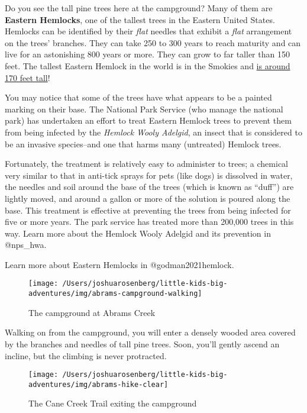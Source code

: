 \documentclass[
]{book}
\begin{document}
\begin{rmdscience}
Do you see the tall pine trees here at the campground? Many of them are
\textbf{Eastern Hemlocks}, one of the tallest trees in the Eastern
United States. Hemlocks can be identified by their \emph{flat} needles
that exhibit a \emph{flat} arrangement on the trees' branches. They can
take 250 to 300 years to reach maturity and can live for an astonishing
800 years or more. They can grow to far taller than 150 feet. The
tallest Eastern Hemlock in the world is in the Smokies and
\href{https://www.monumentaltrees.com/en/trees/tsugacanadensis/records/}{is
around 170 feet tall}!

You may notice that some of the trees have what appears to be a painted
marking on their base. The National Park Service (who manage the
national park) has undertaken an effort to treat Eastern Hemlock trees
to prevent them from being infected by the \emph{Hemlock Wooly Adelgid},
an insect that is considered to be an invasive species--and one that
harms many (untreated) Hemlock trees.

Fortunately, the treatment is relatively easy to administer to trees; a
chemical very similar to that in anti-tick sprays for pets (like dogs)
is dissolved in water, the needles and soil around the base of the trees
(which is known as ``duff'') are lightly moved, and around a gallon or
more of the solution is poured along the base. This treatment is
effective at preventing the trees from being infected for five or more
years. The park service has treated more than 200,000 trees in this way.
Learn more about the Hemlock Wooly Adelgid and its prevention in
@nps\_hwa.

Learn more about Eastern Hemlocks in @godman2021hemlock.
\end{rmdscience}

\begin{figure}

{\centering \texttt{[image: /Users/joshuarosenberg/little-kids-big-adventures/img/abrams-campground-walking]} 

}

\caption{The campground at Abrams Creek}\label{fig:unnamed-chunk-40}
\end{figure}

Walking on from the campground, you will enter a densely wooded area covered
by the branches and needles of tall pine trees. Soon, you'll gently ascend an
incline, but the climbing is never protracted.

\begin{figure}

{\centering \texttt{[image: /Users/joshuarosenberg/little-kids-big-adventures/img/abrams-hike-clear]} 

}

\caption{The Cane Creek Trail exiting the campground}\label{fig:unnamed-chunk-41}
\end{figure}
\end{document}
